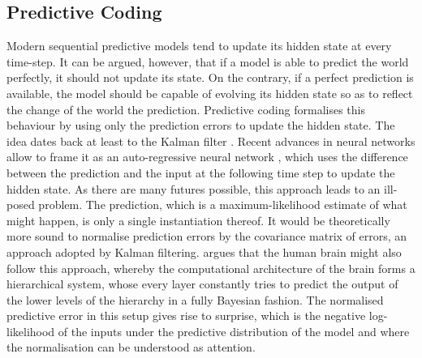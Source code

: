     \subsection{Predictive Coding}
    \label{sec:pred_coding}
        Modern sequential predictive models tend to update its hidden state at every time-step. It can be argued, however, that if a model is able to predict the world perfectly, it should not update its state. On the contrary, if a perfect prediction is available, the model should be capable of evolving its hidden state so as to reflect the change of the world \wrt the prediction. Predictive coding formalises this behaviour by using only the prediction errors to update the hidden state. The idea dates back at least to the Kalman filter \citep{Kalman1960}. Recent advances in neural networks allow to frame it as an auto-regressive neural network \citep{Lotter2016, Canziani2017}, which uses the difference between the prediction and the input at the following time step to update the hidden state. 
        As there are many futures possible, this approach leads to an ill-posed problem. The prediction, which is a maximum-likelihood estimate of what might happen, is only a single instantiation thereof. It would be theoretically more sound to normalise prediction errors by the covariance matrix of errors, an approach adopted by Kalman filtering. \cite{Friston2009guide} argues that 
        the human brain might also follow this approach, whereby the computational architecture of the brain forms a hierarchical system, whose every layer constantly tries to predict the output of the lower levels of the hierarchy in a fully Bayesian fashion. The normalised predictive error in this setup gives rise to surprise, which is the negative log-likelihood of the inputs under the predictive distribution of the model and where the normalisation can be understood as attention.
%
%
